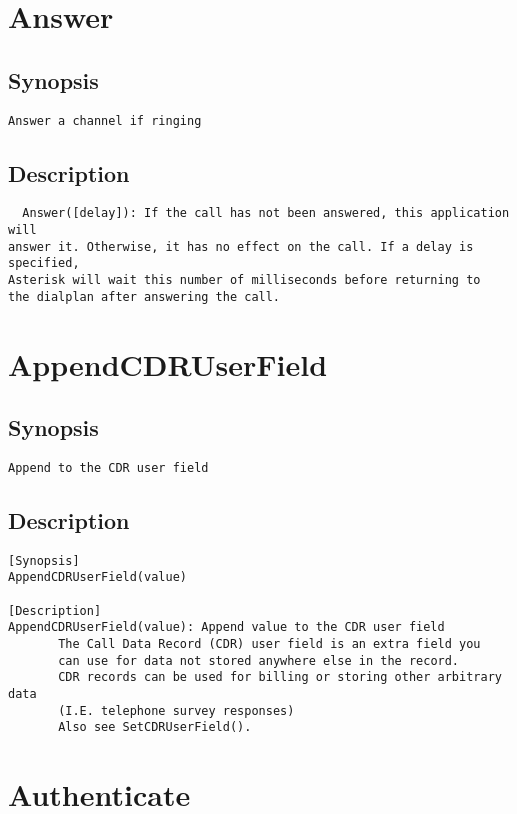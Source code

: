 \section{Answer}
\subsection{Synopsis}
\begin{verbatim}
Answer a channel if ringing
\end{verbatim}
\subsection{Description}
\begin{verbatim}
  Answer([delay]): If the call has not been answered, this application will
answer it. Otherwise, it has no effect on the call. If a delay is specified,
Asterisk will wait this number of milliseconds before returning to
the dialplan after answering the call.

\end{verbatim}


\section{AppendCDRUserField}
\subsection{Synopsis}
\begin{verbatim}
Append to the CDR user field
\end{verbatim}
\subsection{Description}
\begin{verbatim}
[Synopsis]
AppendCDRUserField(value)

[Description]
AppendCDRUserField(value): Append value to the CDR user field
       The Call Data Record (CDR) user field is an extra field you
       can use for data not stored anywhere else in the record.
       CDR records can be used for billing or storing other arbitrary data
       (I.E. telephone survey responses)
       Also see SetCDRUserField().

\end{verbatim}


\section{Authenticate}
